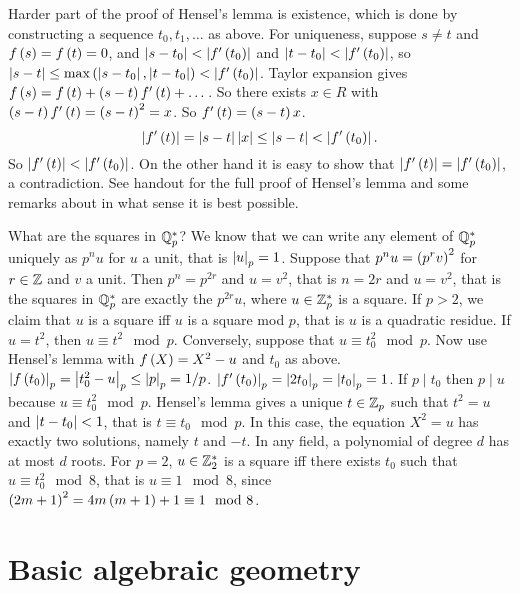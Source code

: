 Harder part of the proof of Hensel's lemma is existence, which is done by constructing a sequence $ t_0, t_1, \dots $ as above. For uniqueness, suppose $ s \ne t $ and $ f\left( s \right) = f\left( t \right) = 0 $, and $ \left\lvert s - t_0 \right\rvert < \left\lvert f'\left( t_0 \right) \right\rvert $ and $ \left\lvert t - t_0 \right\rvert < \left\lvert f'\left( t_0 \right) \right\rvert $, so $ \left\lvert s - t \right\rvert \le \max\left( \left\lvert s - t_0 \right\rvert, \left\lvert t - t_0 \right\rvert \right) < \left\lvert f'\left( t_0 \right) \right\rvert $. Taylor expansion gives $ f\left( s \right) = f\left( t \right) + \left( s - t \right)f'\left( t \right) + \dots $. So there exists $ x \in R $ with $ \left( s - t \right)f'\left( t \right) = \left( s - t \right)^2 = x $. So $ f'\left( t \right) = \left( s - t \right)x $.
$$ \left\lvert f'\left( t \right) \right\rvert = \left\lvert s - t \right\rvert\left\lvert x \right\rvert \le \left\lvert s - t \right\rvert < \left\lvert f'\left( t_0 \right) \right\rvert. $$
So $ \left\lvert f'\left( t \right) \right\rvert < \left\lvert f'\left( t_0 \right) \right\rvert $. On the other hand it is easy to show that $ \left\lvert f'\left( t \right) \right\rvert = \left\lvert f'\left( t_0 \right) \right\rvert $, a contradiction. See handout for the full proof of Hensel's lemma and some remarks about in what sense it is best possible.


What are the squares in $ \mathbb{Q}_p^* $? We know that we can write any element of $ \mathbb{Q}_p^* $ uniquely as $ p^nu $ for $ u $ a unit, that is $ \left\lvert u \right\rvert_p = 1 $. Suppose that $ p^nu = \left( p^rv \right)^2 $ for $ r \in \mathbb{Z} $ and $ v $ a unit. Then $ p^n = p^{2r} $ and $ u = v^2 $, that is $ n = 2r $ and $ u = v^2 $, that is the squares in $ \mathbb{Q}_p^* $ are exactly the $ p^{2r}u $, where $ u \in \mathbb{Z}_p^* $ is a square. If $ p > 2 $, we claim that $ u $ is a square iff $ u $ is a square mod $ p $, that is $ u $ is a quadratic residue. If $ u = t^2 $, then $ u \equiv t^2 \mod p $. Conversely, suppose that $ u \equiv t_0^2 \mod p $. Now use Hensel's lemma with $ f\left( X \right) = X^2 - u $ and $ t_0 $ as above. $ \left\lvert f\left( t_0 \right) \right\rvert_p = \left\lvert t_0^2 - u \right\rvert_p \le \left\lvert p \right\rvert_p = 1 / p $. $ \left\lvert f'\left( t_0 \right) \right\rvert_p = \left\lvert 2t_0 \right\rvert_p = \left\lvert t_0 \right\rvert_p = 1 $. If $ p \mid t_0 $ then $ p \mid u $ because $ u \equiv t_0^2 \mod p $. Hensel's lemma gives a unique $ t \in \mathbb{Z}_p $ such that $ t^2 = u $ and $ \left\lvert t - t_0 \right\rvert < 1 $, that is $ t \equiv t_0 \mod p $. In this case, the equation $ X^2 = u $ has exactly two solutions, namely $ t $ and $ -t $. In any field, a polynomial of degree $ d $ has at most $ d $ roots. For $ p = 2 $, $ u \in \mathbb{Z}_2^* $ is a square iff there exists $ t_0 $ such that $ u \equiv t_0^2 \mod 8 $, that is $ u \equiv 1 \mod 8 $, since $ \left( 2m + 1 \right)^2 = 4m\left( m + 1 \right) + 1 \equiv 1 \mod 8 $.

\pagebreak

\section{Basic algebraic geometry}

